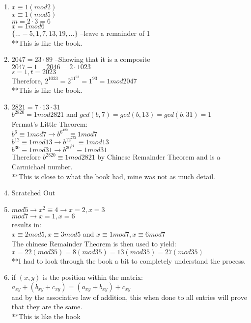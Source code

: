 \documentclass{article}
\begin{document}
\begin{enumerate}
\item	$x \equiv 1 (mod 2)$ \\
	$x \equiv 1 (mod 5)$ \\
	$m = 2\cdot 3 = 6$ \\
	$x = 1 mod 6$ \\
	$\{...-5, 1, 7, 13, 19,...\}$ --leave a remainder of 1 \\
	**This is like the book.

\item	$2047 = 23 \cdot 89$ --Showing that it is a composite \\
	$2047 - 1 = 2046 = 2 \cdot 1023$ \\
	$s = 1, t = 2023$ \\
	Therefore, $2^1023 = 2^{11^{93}} = 1^{93} = 1 mod 2047$ \\
	**This is like the book.

\item 	$2821 = 7 \cdot 13 \cdot 31$ \\
	$b^{2820} = 1 mod 2821$ and $gcd(b,7) = gcd(b,13) = gcd(b,31) = 1$ \\
	Fermat's Little Theorem: \\
	$b^6 \equiv 1 mod 7 \rightarrow b^{6^{420}} \equiv 1 mod 7$ \\
	$b^{12} \equiv 1 mod 13 \rightarrow b^{12^{233}} \equiv 1 mod 13$ \\
	$b^{30} \equiv 1 mod 31 \rightarrow b^{30^{94}} \equiv 1 mod 31$ \\
	Therefore $b^2820 \equiv 1 mod 2821$ by Chinese Remainder Theorem and is a Carmichael number. \\
	**This is close to what the book had, mine was not as much detail.

\item Scratched Out

\item 	$mod 5 \rightarrow x^2 \equiv 4 \rightarrow x=2, x=3$ \\
	$mod 7 \rightarrow x = 1, x = 6$ \\
	results in: \\
	$x \equiv 2 mod 5, x \equiv 3 mod 5$ and $ x \equiv 1 mod7, x \equiv 6 mod 7$ \\
	The chinese Remainder Theorem is then used to yield:
	$x = 22(mod35) = 8(mod35) = 13(mod35) = 27(mod35)$ \\
	**I had to look through the book a bit to completely understand the process.

\item if $(x,y)$ is the position within the matrix: \\
	$a_{xy}+(b_{xy}+c_{xy}) = (a_{xy}+b_{xy}) + c_{xy}$ \\
	and by the associative law of addition, this when done to all entries will prove that they are the same.\\
	**This is like the book


\end{enumerate}
\end{document}
